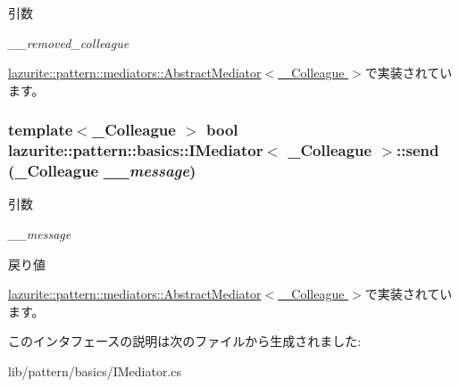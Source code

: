 \begin{DoxyParams}{引数}
\item[{\em \_\-\_\-removed\_\-colleague}]\end{DoxyParams}


\hyperlink{classlazurite_1_1pattern_1_1mediators_1_1_abstract_mediator_3_01___colleague_01_4_aa15986b46e385754fe1a8fdde417e63c}{lazurite::pattern::mediators::AbstractMediator$<$ \_\-Colleague $>$}で実装されています。\hypertarget{interfacelazurite_1_1pattern_1_1basics_1_1_i_mediator_3_01___colleague_01_4_a60b933645ef7e6f3fd5c9de47bda90df}{
\subsubsection[{send}]{\setlength{\rightskip}{0pt plus 5cm}template$<$\_\-Colleague $>$ bool lazurite::pattern::basics::IMediator$<$ \_\-Colleague $>$::send (\_\-Colleague {\em \_\-\_\-message})}}
\label{interfacelazurite_1_1pattern_1_1basics_1_1_i_mediator_3_01___colleague_01_4_a60b933645ef7e6f3fd5c9de47bda90df}

\begin{DoxyParams}{引数}
\item[{\em \_\-\_\-message}]\end{DoxyParams}
\begin{DoxyReturn}{戻り値}

\end{DoxyReturn}


\hyperlink{classlazurite_1_1pattern_1_1mediators_1_1_abstract_mediator_3_01___colleague_01_4_a1b702e3797af6ce233dd4ac910d63282}{lazurite::pattern::mediators::AbstractMediator$<$ \_\-Colleague $>$}で実装されています。

このインタフェースの説明は次のファイルから生成されました:\begin{DoxyCompactItemize}
\item 
lib/pattern/basics/IMediator.cs\end{DoxyCompactItemize}
